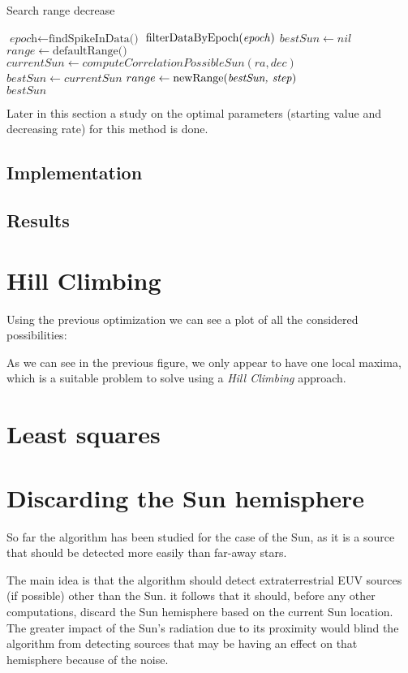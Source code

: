 \begin{algorithm}
	\caption{Search range decrease}\label{searchRangeDecrease}
	\begin{algorithmic}[1]
		\State $\textit{epoch} \gets \text{findSpikeInData()}$ 
		\State $\text{filterDataByEpoch(\textit{epoch})}$
		\State $bestSun \gets nil$
		\State $range \gets \text{defaultRange()}$ 
		\State $currentSun \gets computeCorrelationPossibleSun(ra, dec)$
		\State $bestSun \gets currentSun$
		\State $range \gets \text{newRange(\textit{bestSun, step})}$ 
		\EndIf
		\EndFor
		\EndFor
		\EndFor
		\\
		\Return $bestSun$
		\EndProcedure
	\end{algorithmic}
\end{algorithm}

Later in this section a study on the optimal parameters (starting value and decreasing rate) for this method is done. 

\subsection{Implementation}

\subsection{Results}

\section{Hill Climbing}

Using the previous optimization we can see a plot of all the considered possibilities:

As we can see in the previous figure, we only appear to have one local maxima, which is a suitable problem to solve using a \textit{Hill Climbing} approach.

\section{Least squares}


\section{Discarding the Sun hemisphere}

So far the algorithm has been studied for the case of the Sun, as it is a source that should be detected more easily than far-away stars. 

The main idea is that the algorithm should detect extraterrestrial EUV sources (if possible) other than the Sun. it follows that it should, before any other computations, discard the Sun hemisphere based on the current Sun location. The greater impact of the Sun's radiation due to its proximity would blind the algorithm from detecting sources that may be having an effect on that hemisphere because of the noise.